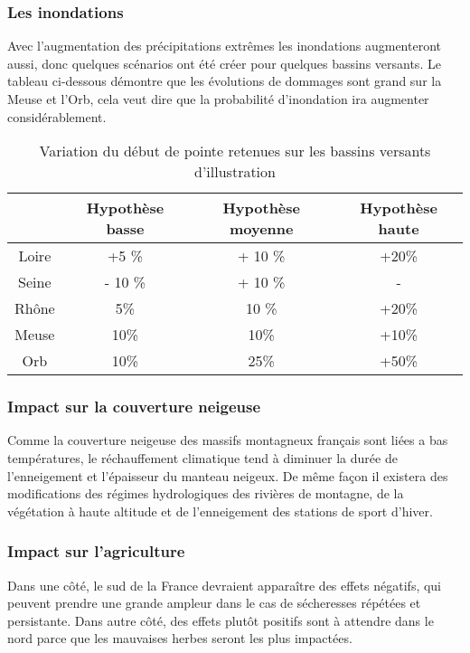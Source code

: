 \documentclass[a4paper,11pt]{article}
\begin{document}
\subsubsection*{Les inondations}
Avec  l'augmentation des  précipitations extrêmes  les  inondations augmenteront
aussi, donc quelques scénarios ont été créer pour quelques bassins versants.
Le tableau ci-dessous démontre que les  évolutions de dommages sont grand sur la
Meuse et  l'Orb, cela veut dire  que la probabilité  d'inondation ira augmenter
considérablement. 


\begin{table}[H]
  \begin{center}
    \caption{Variation du début de pointe retenues sur les bassins versants d’illustration}
    \begin{tabular}{|c|c|c|c|}
      \hline
      & Hypothèse basse &Hypothèse moyenne &Hypothèse haute\\
      \hline
      Loire & +5 \% & + 10 \% & +20\%\\
      Seine & - 10 \% &+ 10 \% & - \\ 
      Rhône & 5\% & 10 \% & +20\%\\
      Meuse & 10\%& 10\%& +10\%\\
      Orb &10\% & 25\% & +50\% \\
      \hline
    \end{tabular}
  \end{center}
\end{table}

\subsubsection*{Impact sur la couverture neigeuse}
Comme la  couverture neigeuse des massifs  montagneux français sont  liées a bas
températures,  le   réchauffement  climatique  tend  à  diminuer   la  durée  de
l’enneigement et l’épaisseur  du manteau neigeux. De même  façon il existera des
modifications  des  régimes  hydrologiques  des  rivières  de  montagne,  de  la
végétation à haute altitude et de l’enneigement des stations de sport d’hiver. 


\subsubsection*{Impact sur l’agriculture}
Dans une côté, le sud de la France devraient apparaître des effets négatifs, qui
peuvent  prendre une  grande  ampleur dans  le  cas de  sécheresses répétées  et
persistante. Dans autre côté, des effets plutôt positifs sont à attendre dans le
nord parce que les mauvaises herbes seront les plus impactées.
\end{document}
